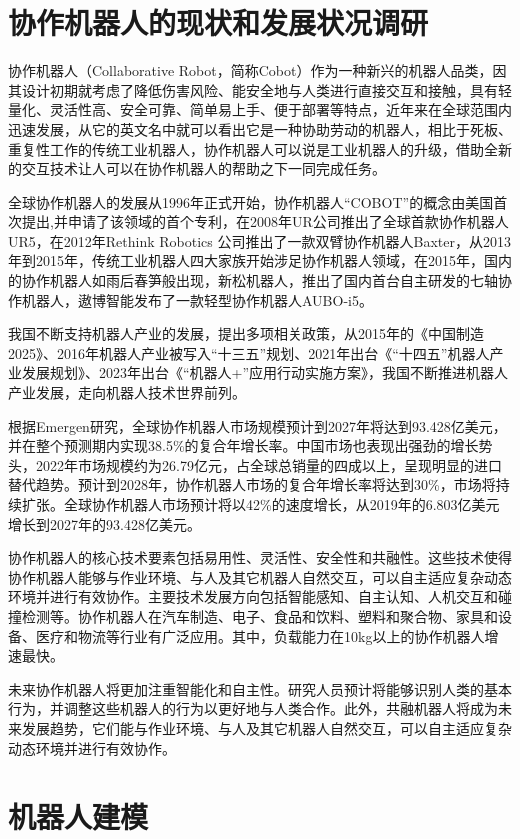 \section{协作机器人的现状和发展状况调研}
协作机器人（Collaborative Robot，简称Cobot）作为一种新兴的机器人品类，因其设计初期就考虑了降低伤害风险、能安全地与人类进行直接交互和接触，具有轻量化、灵活性高、安全可靠、简单易上手、便于部署等特点，近年来在全球范围内迅速发展，从它的英文名中就可以看出它是一种协助劳动的机器人，相比于死板、重复性工作的传统工业机器人，协作机器人可以说是工业机器人的升级，借助全新的交互技术让人可以在协作机器人的帮助之下一同完成任务。

全球协作机器人的发展从1996年正式开始，协作机器人“COBOT”的概念由美国首次提出,并申请了该领域的首个专利，在2008年UR公司推出了全球首款协作机器人 UR5，在2012年Rethink Robotics 公司推出了一款双臂协作机器人Baxter，从2013年到2015年，传统工业机器人四大家族开始涉足协作机器人领域，在2015年，国内的协作机器人如雨后春笋般出现，新松机器人，推出了国内首台自主研发的七轴协作机器人，遨博智能发布了一款轻型协作机器人AUBO-i5。

我国不断支持机器人产业的发展，提出多项相关政策，从2015年的《中国制造2025》、2016年机器人产业被写入“十三五”规划、2021年出台《“十四五”机器人产业发展规划》、2023年出台《“机器人+”应用行动实施方案》，我国不断推进机器人产业发展，走向机器人技术世界前列。

根据Emergen研究，全球协作机器人市场规模预计到2027年将达到93.428亿美元，并在整个预测期内实现38.5\%的复合年增长率。中国市场也表现出强劲的增长势头，2022年市场规模约为26.79亿元，占全球总销量的四成以上，呈现明显的进口替代趋势。预计到2028年，协作机器人市场的复合年增长率将达到30\%，市场将持续扩张。全球协作机器人市场预计将以42\%的速度增长，从2019年的6.803亿美元增长到2027年的93.428亿美元。

协作机器人的核心技术要素包括易用性、灵活性、安全性和共融性。这些技术使得协作机器人能够与作业环境、与人及其它机器人自然交互，可以自主适应复杂动态环境并进行有效协作。主要技术发展方向包括智能感知、自主认知、人机交互和碰撞检测等。协作机器人在汽车制造、电子、食品和饮料、塑料和聚合物、家具和设备、医疗和物流等行业有广泛应用。其中，负载能力在10kg以上的协作机器人增速最快。

未来协作机器人将更加注重智能化和自主性。研究人员预计将能够识别人类的基本行为，并调整这些机器人的行为以更好地与人类合作。此外，共融机器人将成为未来发展趋势，它们能与作业环境、与人及其它机器人自然交互，可以自主适应复杂动态环境并进行有效协作。

\section{机器人建模}
